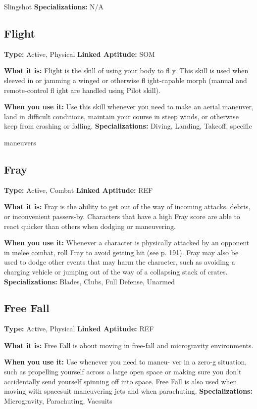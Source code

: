 Slingshot
\textbf{Specializations:} N/A

\subsection{Flight}

\textbf{Type:} Active, Physical
\textbf{Linked Aptitude:} SOM

\textbf{What it is:} Flight is the skill of using your body to 
fl y. This skill is used when sleeved in or jamming a 
winged or otherwise fl ight-capable morph (manual and 
remote-control fl ight are handled using Pilot skill).

\textbf{When you use it:} Use this skill whenever you need to 
make an aerial maneuver, land in difficult conditions, 
maintain your course in steep winds, or otherwise 
keep from crashing or falling.
\textbf{Specializations:} Diving, Landing, Takeoff, specific 

maneuvers

\subsection{Fray}

\textbf{Type:} Active, Combat
\textbf{Linked Aptitude:} REF

\textbf{What it is:} Fray is the ability to get out of the way 
of incoming attacks, debris, or inconvenient passers-by. 
Characters that have a high Fray score are able to react 
quicker than others when dodging or maneuvering.

\textbf{When you use it:} Whenever a character is physically 
attacked by an opponent in melee combat, roll Fray to 
avoid getting hit (see p. 191). Fray may also be used 
to dodge other events that may harm the character, 
such as avoiding a charging vehicle or jumping out of 
the way of a collapsing stack of crates.
\textbf{Specializations:} Blades, Clubs, Full Defense, Unarmed

\subsection{Free Fall}

\textbf{Type:} Active, Physical
\textbf{Linked Aptitude:} REF

\textbf{What it is:} Free Fall is about moving in free-fall and 
microgravity environments.

\textbf{When you use it:} Use whenever you need to maneu-
ver in a zero-g situation, such as propelling yourself 
across a large open space or making sure you don't 
accidentally send yourself spinning off into space. 
Free Fall is also used when moving with spacesuit 
maneuvering jets and when parachuting.
\textbf{Specializations:} Microgravity, Parachuting, Vacsuits

